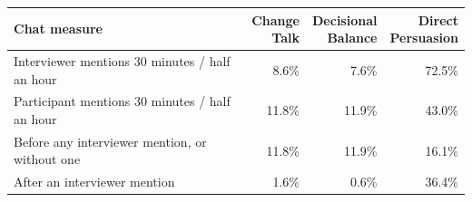\begin{tabularx}{\textwidth}{@{}>{\raggedright\arraybackslash}Xrrr@{}}
\toprule
Chat measure & \shortstack{Change\\Talk} & \shortstack{Decisional\\Balance} & \shortstack{Direct\\Persuasion} \\
\midrule
Interviewer mentions 30 minutes / half an hour & 8.6\% & 7.6\% & 72.5\% \\
\addlinespace[0.7em]
Participant mentions 30 minutes / half an hour & 11.8\% & 11.9\% & 43.0\% \\
\quad Before any interviewer mention, or without one & 11.8\% & 11.9\% & 16.1\% \\
\quad After an interviewer mention & 1.6\% & 0.6\% & 36.4\% \\
\bottomrule
\end{tabularx}
